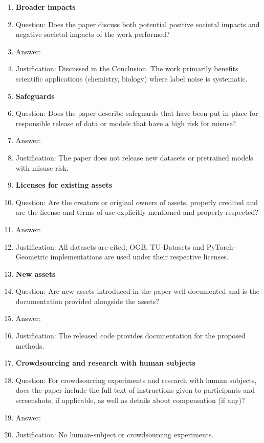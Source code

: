 \begin{enumerate}
\item {\bf Broader impacts}
    \item[] Question: Does the paper discuss both potential positive societal impacts and negative societal impacts of the work performed?
    \item[] Answer: \answerYes{}
    \item[] Justification: Discussed in the Conclusion. The work primarily benefits scientific applications (chemistry, biology) where label noise is systematic.

\item {\bf Safeguards}
    \item[] Question: Does the paper describe safeguards that have been put in place for responsible release of data or models that have a high risk for misuse?
    \item[] Answer: \answerNA{}
    \item[] Justification: The paper does not release new datasets or pretrained models with misuse risk.

\item {\bf Licenses for existing assets}
    \item[] Question: Are the creators or original owners of assets, properly credited and are the license and terms of use explicitly mentioned and properly respected?
    \item[] Answer: \answerYes{}
    \item[] Justification: All datasets are cited; OGB, TU-Datasets and PyTorch-Geometric implementations are used under their respective licenses.

\item {\bf New assets}
    \item[] Question: Are new assets introduced in the paper well documented and is the documentation provided alongside the assets?
    \item[] Answer: \answerYes{}
    \item[] Justification: The released code provides documentation for the proposed methods.

\item {\bf Crowdsourcing and research with human subjects}
    \item[] Question: For crowdsourcing experiments and research with human subjects, does the paper include the full text of instructions given to participants and screenshots, if applicable, as well as details about compensation (if any)?
    \item[] Answer: \answerNA{}
    \item[] Justification: No human-subject or crowdsourcing experiments.


\end{enumerate}
